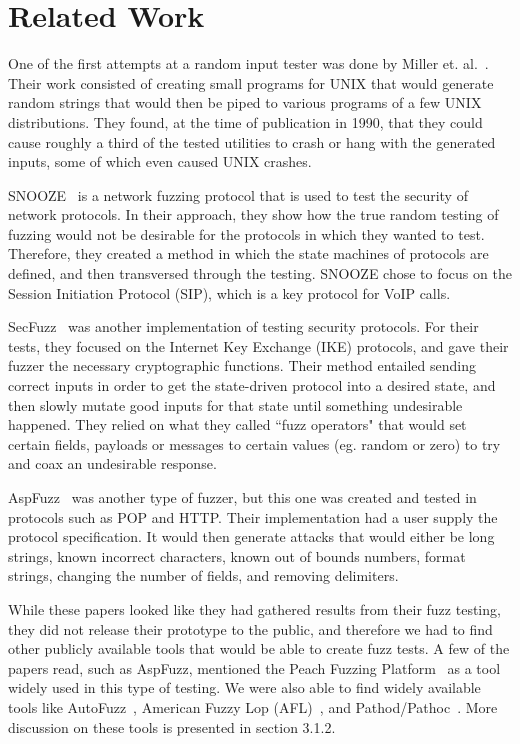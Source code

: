 \documentclass[letterpaper,twocolumn,10pt]{article}
\begin{document}
\section{Related Work} 

One of the first attempts at a random input tester was done by Miller et. al.~\cite{millerUNIX}. Their work consisted of creating small programs for UNIX that would generate random strings that would then be piped to various programs of a few UNIX distributions. They found, at the time of publication in 1990, that they could cause roughly a third of the tested utilities to crash or hang with the generated inputs, some of which even caused UNIX crashes.

SNOOZE~\cite{snooze} is a network fuzzing protocol that is used to test the security of network protocols. In their approach, they show how the true random testing of fuzzing would not be desirable for the protocols in which they wanted to test. Therefore, they created a method in which the state machines of protocols are defined, and then transversed through the testing. SNOOZE chose to focus on the Session Initiation Protocol (SIP), which is a key protocol for VoIP calls.

SecFuzz~\cite{secfuzz} was another implementation of testing security protocols. For their tests, they focused on the Internet Key Exchange (IKE) protocols, and gave their fuzzer the necessary cryptographic functions. Their method entailed sending correct inputs in order to get the state-driven protocol into a desired state, and then slowly mutate good inputs for that state until something undesirable happened. They relied on what they called ``fuzz operators" that would set certain fields, payloads or messages to certain values (eg. random or zero) to try and coax an undesirable response.

AspFuzz~\cite{aspfuzz} was another type of fuzzer, but this one was created and tested in protocols such as POP and HTTP. Their implementation had a user supply the protocol specification. It would then generate attacks that would either be long strings, known incorrect characters, known out of bounds numbers, format strings, changing the number of fields, and removing delimiters. 

While these papers looked like they had gathered results from their fuzz testing, they did not release their prototype to the public, and therefore we had to find other publicly available tools that would be able to create fuzz tests. A few of the papers read, such as AspFuzz, mentioned the Peach Fuzzing Platform~\cite{peach} as a tool widely used in this type of testing. We were also able to find widely available tools like AutoFuzz~\cite{autofuzz}, American Fuzzy Lop (AFL)~\cite{afl}, and Pathod/Pathoc~\cite{pathod}. More discussion on these tools is presented in section 3.1.2.
\end{document}
